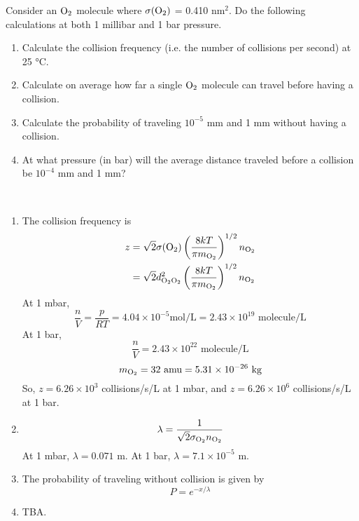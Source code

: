 \item Consider an $\ce{O_2}$ molecule where $\sigma(\ce{O_2})$ = 0.410 nm$^2$.
Do the following calculations at both 1 millibar and 1 bar pressure.
\begin{enumerate}
    \item Calculate the collision frequency (i.e. the number of collisions per second) at 25 °C.
    \item Calculate on average how far a single $\ce{O_2}$ molecule can travel before having a collision.
    \item Calculate the probability of traveling $10^{-5}$ mm and 1 mm without having a collision.
    \item At what pressure (in bar) will the average distance traveled before a collision be $10^{-4}$ mm and
          1 mm?
\end{enumerate}

\begin{solution}\
    \begin{enumerate}
        \item The collision frequency is
              \begin{equation*}
                  \begin{aligned}
                      z & =\sqrt{2}\sigma(\ce{O_2})\left(\frac{8kT}{\pi m_{\ce{O2}}}\right)^{1/2}n_{\ce{O2}}  \\
                        & =\sqrt{2}d_{\ce{O_2O_2}}^2\left(\frac{8kT}{\pi m_{\ce{O2}}}\right)^{1/2}n_{\ce{O2}}
                  \end{aligned}
              \end{equation*}
              At 1 mbar,
              \begin{equation*}
                  \frac{n}{V}=\frac{p}{RT}=4.04\times10^{-5}\text{mol/L}=2.43\times10^{19}\text{ molecule/L}
              \end{equation*}
              At 1 bar,
              \begin{equation*}
                  \frac{n}{V}=2.43\times10^{22}\text{ molecule/L}
              \end{equation*}
              \begin{equation*}
                  m_{\ce{O_2}}=32\text{ amu}=5.31\times10^{-26}\text{ kg}
              \end{equation*}
              So, $z=6.26\times10^3$ collisions/s/L at 1 mbar, and $z=6.26\times10^6$ collisions/s/L at 1 bar.
        \item \begin{equation*}
                  \lambda =\frac{1}{\sqrt{2}\sigma_{\ce{O_2}}n_{\ce{O_2}}}
              \end{equation*}
              At 1 mbar, $\lambda=0.071$ m. At 1 bar, $\lambda=7.1\times10^{-5}$ m.
        \item The probability of traveling without collision is given by
              \begin{equation*}
                  P=e^{-x/\lambda}
              \end{equation*}
        \item TBA.
    \end{enumerate}
\end{solution}

